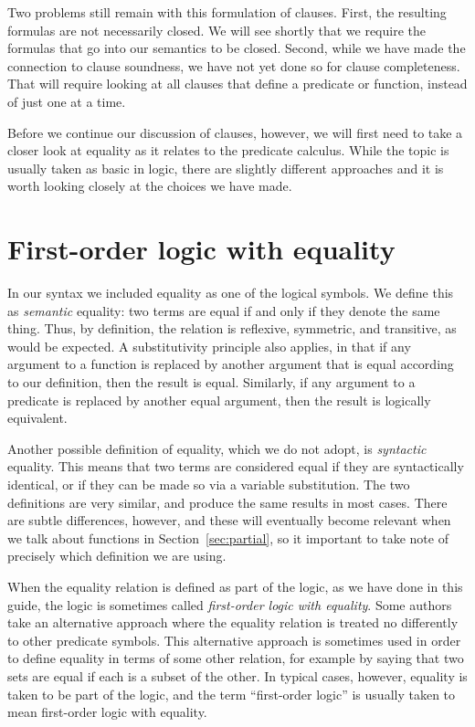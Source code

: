 Two problems still remain with this formulation of clauses.
First,
the resulting formulas are not necessarily closed.
We will see shortly that we require
the formulas that go into our semantics to be closed.
Second,
while we have made the connection to clause soundness,
we have not yet done so for clause completeness.
That will require looking at
all clauses that define a predicate or function,
instead of just one at a time.

Before we continue our discussion of clauses, however,
we will first need to take a closer look at equality
as it relates to the predicate calculus.
While the topic is usually taken as basic in logic,
there are slightly different approaches
and it is worth looking closely at the choices we have made.


\section{First-order logic with equality}
\label{sec:sem-equality}

In our syntax we included equality
as one of the logical symbols.
We define this as \emph{semantic} equality\label{gi:semantic-equality}:
two terms are equal if and only if they denote the same thing.
Thus, by definition, the relation is
reflexive, symmetric, and transitive,
as would be expected.
A substitutivity principle also applies,
in that if any argument to a function
is replaced by another argument that is equal according to our definition,
then the result is equal.
Similarly, if any argument to a predicate
is replaced by another equal argument,
then the result is logically equivalent.

Another possible definition of equality,
which we do not adopt,
is \emph{syntactic} equality.
This means that two terms are considered equal
if they are syntactically identical,
or if they can be made so via a variable substitution.
The two definitions are very similar,
and produce the same results in most cases.
There are subtle differences, however,
and these will eventually become relevant
when we talk about  functions
in Section~\ref{sec:partial},
so it important to take note of
precisely which definition we are using.

When the equality relation is defined as part of the logic,
as we have done in this guide,
the logic is sometimes called
\emph{first-order logic with equality}.
Some authors take an alternative approach where
the equality relation is treated
no differently to other predicate symbols.
This alternative approach is sometimes used in order to
define equality in terms of some other relation,
for example by saying that
two sets are equal if each is a subset of the other.
In typical cases, however,
equality is taken to be part of the logic,
and the term ``first-order logic''
is usually taken to mean first-order logic with equality.

